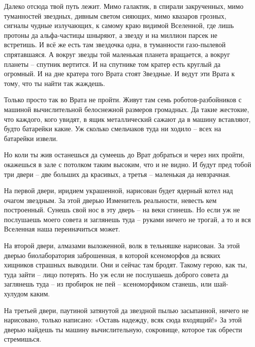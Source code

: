 \documentclass[ebook,oneside,final,openright]{memoir}
\begin{document}
\par
Далеко отсюда твой путь лежит. Мимо галактик, в спирали закрученных, мимо туманностей звездных, дивным светом сияющих, мимо квазаров грозных, сигналы чудные излучающих, к самому краю видимой Вселенной, где лишь протоны да альфа-частицы шныряют, а звезду и на миллион парсек не встретишь. И всё же есть там звездочка одна, в туманности газо-пылевой спрятавшаяся. А вокруг звезды той маленькая планета вращается, а вокруг планеты – спутник вертится. И на спутнике том кратер есть круглый да огромный. И на дне кратера того Врата стоят Звездные. И ведут эти Врата к тому, что ты найти так жаждешь.\par
\par
Только просто так во Врата не пройти. Живут там семь роботов-разбойников с машиной вычислительной белоснежной размеров громадных. Да такие жестокие, что каждого, кого увидят, в ящик металлический сажают да в машину вставляют, будто батарейки какие. Уж сколько смельчаков туда ни ходило – всех на батарейки извели.\par
\par
Но коли ты жив останешься да сумеешь до Врат добраться и через них пройти, окажешься в зале с потолком таким высоким, что и не видно. И будут пред тобой три двери – две больших да красивых, а третья – маленькая да невзрачная.\par
\par
На первой двери, иридием украшенной, нарисован будет ядерный котел над очагом звездным. За этой дверью Изменитель реальности, невесть кем построенный. Сунешь свой нос в эту дверь – на веки сгинешь. Но если уж не послушаешь моего совета и заглянешь туда – руками ничего не трогай, а то и вся Вселенная наша переиначиться может.\par
\par
На второй двери, алмазами выложенной, волк в тельняшке нарисован. За этой дверью биолаборатория заброшенная, в которой ксеноморфов да всяких хищников страшных выводили. Они и сейчас там бродят. Такому герою, как ты, туда зайти – лицо потерять. Но уж если не послушаешь доброго совета да заглянешь туда – из пробирок не пей – ксеноморфиком станешь, или шай-хулудом каким.\par
\par
На третьей двери, паутиной затянутой да звездной пылью засыпанной, ничего не нарисовано, только написано: «Оставь надежду, всяк сюда входящий!» За этой дверью найдешь ты машину вычислительную, сокровище, которое так обрести стремишься.\par
\end{document}
